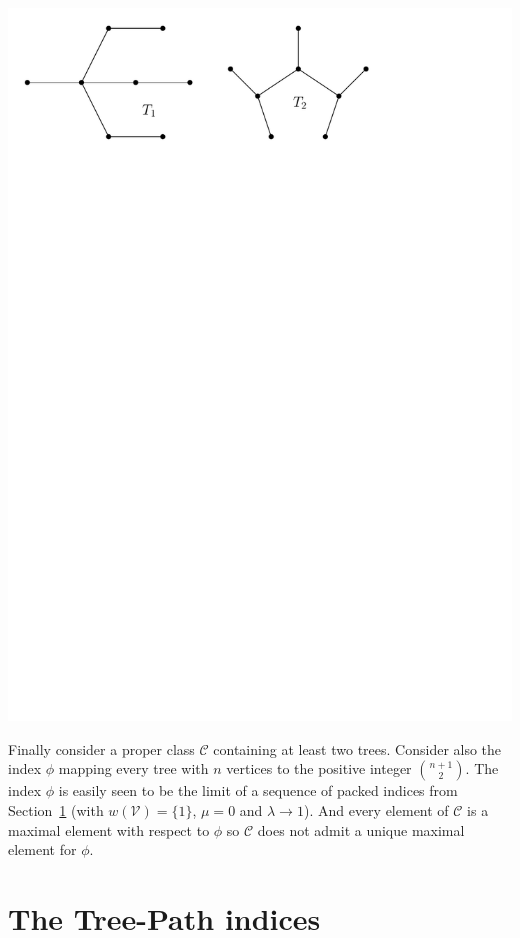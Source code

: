 \documentclass[11 pt]{modarticle}
\newcommand{\vset}{\mathcal{V}}
\newcommand{\wmap}{w}
\newcommand{\tclass}{\mathcal{C}}
\begin{document}
\begin{center}
	\includegraphics[scale=0.5]{figures/counter-example}
\end{center}

Finally consider a proper class $\tclass$ containing at least two trees. Consider also the index $\phi$ mapping every tree with $n$ vertices to the positive integer ${n+1}\choose{2}$. The index $\phi$ is easily seen to be the limit of a sequence of packed indices from Section~\ref{section:tp-indices} (with $\wmap(\vset)= \{1\}$, $\mu = 0$ and $\lambda \rightarrow 1$). And every element of $\tclass$ is a maximal element with respect to $\phi$ so $\tclass$ does not admit a unique maximal element for $\phi$. 




\section{The Tree-Path indices}\label{section:tp-indices}
\end{document}
